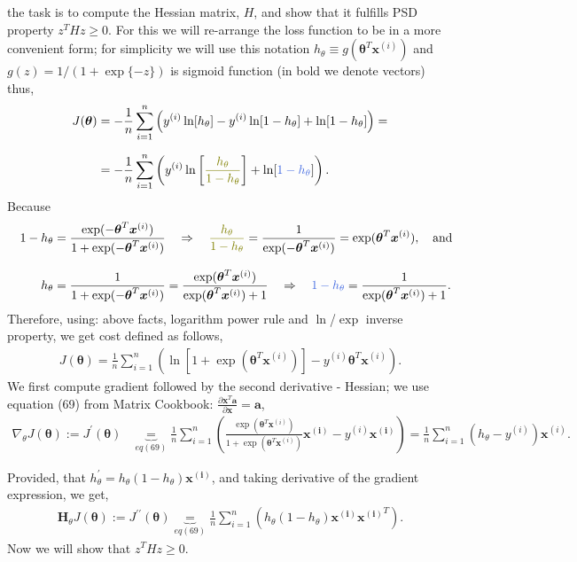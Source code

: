 \documentclass{article}
\newcommand{\bl}[1]{\boldsymbol{#1}}
\begin{document}
\begin{enumerate}[label=\alph*)]
the task is to compute the Hessian matrix, $H$, and show that it fulfills PSD property $z^THz\geq 0$.  For this we will re-arrange the loss function to be in a more convenient form; for simplicity we will use this notation $h_\theta\equiv g(\bl{\theta}^T\bl{x}^{(i)})$ and $g(z) = 1/(1+\exp\{-z\})$ is sigmoid function (in bold we denote vectors) thus,
\begin{align*}
     J(\bl{\theta}) & = -\frac{1}{n}\sum\limits_{i=1}^{n}\left(y^{(i)} \ln[h_\theta] - y^{(i)}\ln[1-h_\theta] + \ln[1-h_\theta] \right) = \\[6pt]
    & = -\frac{1}{n}\sum\limits_{i=1}^{n}\left(y^{(i)}\ln\left[{\color{OliveGreen}\frac{h_\theta}{1-h_\theta}}\right] + \ln[{\color{RoyalBlue}1-h_\theta}]\right). 
\end{align*}
Because
\begin{align*}
  \quad 1-h_\theta & = \frac{\exp(-\bl{\theta}^T\bl{x}^{(i)})}{1+\exp(-\bl{\theta}^T\bl{x}^{(i)})}\quad \Rightarrow \quad {\color{OliveGreen}\frac{h_\theta}{1-h_\theta}}= \frac{1}{\exp(-\bl{\theta}^T\bl{x}^{(i)})}=\exp(\bl{\theta}^T\bl{x}^{(i)}),\quad\mbox{and}\\[8pt]
h_\theta & = \frac{1}{1+\exp(-\bl{\theta}^T\bl{x}^{(i)})} = \frac{\exp(\bl{\theta}^T\bl{x}^{(i)})}{\exp(\bl{\theta}^T\bl{x}^{(i)}) + 1}\quad\Rightarrow\quad {\color{RoyalBlue}1-h_\theta} = \frac{1}{\exp(\bl{\theta}^T\bl{x}^{(i)})+1}.
\end{align*}
Therefore, using: above facts, logarithm power rule and $\ln$/$\exp$  inverse property, we get cost defined as follows,
\begin{align*}
    \boxed{J(\bl{\theta}) =\frac{1}{n}\sum\limits_{i=1}^{n}\left( \ln\left[1+\exp(\bl{\theta}^T\bl{x}^{(i)})\right] -y^{(i)}\bl{\theta}^T\bl{x}^{(i)} \right).}
\end{align*}
We first compute gradient followed by the second derivative - Hessian; we use equation (69) from Matrix Cookbook: $\frac{\partial \bl{x}^T\bl{a}}{\partial \bl{x}} = \bl{a}$,
\begin{align*}
  \nabla_{\theta} J(\bl{\theta}) := J^{\prime}(\bl{\theta}) & \underbrace{=}_{eq (69)}   \frac{1}{n}\sum\limits_{i=1}^{n}\left( \frac{\exp(\bl{\theta}^T\bl{x}^{(i)})}{1+ \exp(\bl{\theta}^T\bl{x}^{(i)})} \bl{x^{(i)}} - y^{(i)}\bl{x^{(i)}} \right) = \frac{1}{n}\sum\limits_{i=1}^{n}\left( h_\theta -  y^{(i)}\right)\bl{x}^{(i)}.
\end{align*}

Provided, that $h^{\prime}_\theta = h_\theta(1-h_\theta)\bl{x^{(i)}}$, and taking derivative of the gradient expression, we get,  
\begin{align*} 
    \bl{H}_{\theta} J(\bl{\theta}):= J^{\prime\prime} (\bl{\theta}) \underbrace{=}_{eq (69)} \frac{1}{n}\sum\limits_{i=1}^{n}\left( h_\theta(1-h_\theta) \bl{x^{(i)}}\bl{x^{(i)}}^T\right ).
\end{align*}
\vskip 0.5cm
Now we will show that $z^THz\geq 0$.


\end{enumerate}
\end{document}

